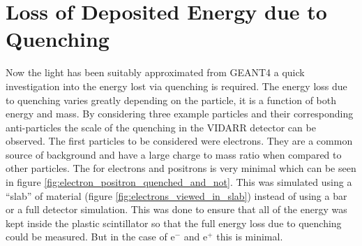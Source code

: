 \section{Loss of Deposited Energy due to Quenching}\label{sec:GEANT4Simulation_quenchingLoss}
Now the light has been suitably approximated from GEANT4 a quick investigation into the energy lost via quenching is required. The energy loss due to quenching varies greatly depending on the particle, it is a function of both energy and mass. By considering three example particles and their corresponding anti-particles the scale of the quenching in the VIDARR detector can be observed. The first particles to be considered were electrons. They are a common source of background and have a large charge to mass ratio when compared to other particles. The for electrons and positrons is very minimal which can be seen in figure \ref{fig:electron_positron_quenched_and_not}. This was simulated using a ``slab'' of material (figure \ref{fig:electrons_viewed_in_slab}) instead of using a bar or a full detector simulation. This was done to ensure that all of the energy was kept inside the plastic scintillator so that the full energy loss due to quenching could be measured. But in the case of e$^-$ and e$^+$ this is minimal. 

